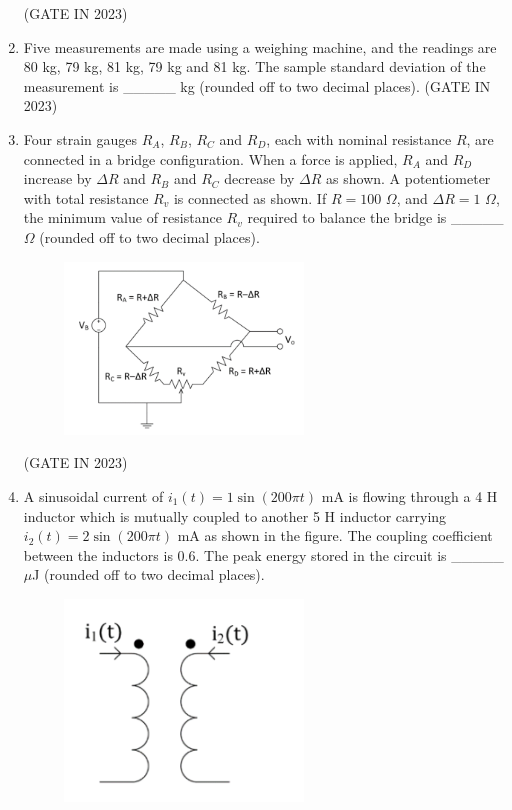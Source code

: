 \documentclass[journal]{IEEEtran}
\begin{document}
\begin{enumerate}
\hfill(GATE IN 2023)
    \item Five measurements are made using a weighing machine, and the readings are 80 kg, 79 kg, 81 kg, 79 kg and 81 kg. The sample standard deviation of the measurement is \_\_\_\_\_ kg (rounded off to two decimal places).
\hfill(GATE IN 2023)
    \item Four strain gauges $R_A$, $R_B$, $R_C$ and $R_D$, each with nominal resistance $R$, are connected in a bridge configuration. When a force is applied, $R_A$ and $R_D$ increase by $\Delta R$ and $R_B$ and $R_C$ decrease by $\Delta R$ as shown. A potentiometer with total resistance $R_v$ is connected as shown. If $R = 100$ $\Omega$, and $\Delta R = 1$ $\Omega$, the minimum value of resistance $R_v$ required to balance the bridge is \_\_\_\_\_ $\Omega$ (rounded off to two decimal places).
    \begin{figure}[H]
    \centering
      \includegraphics[width=0.6\textwidth]{26.png} 
      \caption{}
    \label{fig:fig26} 
\end{figure}
\hfill(GATE IN 2023)
    \item A sinusoidal current of $i_1(t) = 1 \sin(200\pi t)$ mA is flowing through a 4 H inductor which is mutually coupled to another 5 H inductor carrying $i_2(t) = 2 \sin(200\pi t)$ mA as shown in the figure. The coupling coefficient between the inductors is 0.6. The peak energy stored in the circuit is \_\_\_\_\_ $\mu$J (rounded off to two decimal places).
    \begin{figure}[H]
    \centering
      \includegraphics[width=0.6\textwidth]{27.png} 

\end{figure}
\end{enumerate}
\end{document}
